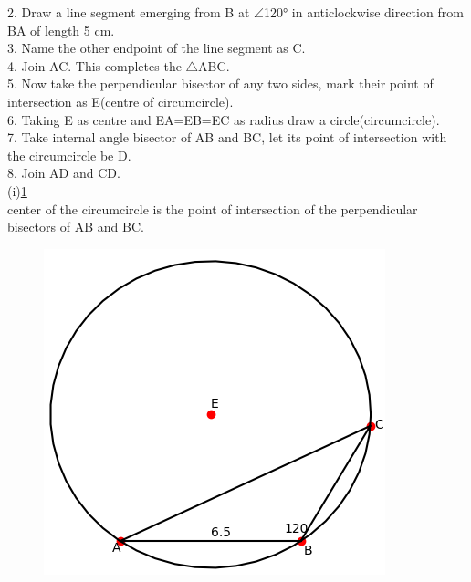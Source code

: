 \documentclass[journal,12pt,twocolumn]{IEEEtran}
\renewcommand\thesection{\arabic{section}}
\begin{document}
\begin{enumerate}[label=\thesection.\arabic*.,ref=\thesection.\theenumi]
2. Draw a line segment emerging from B at $\angle$120° in anticlockwise direction from BA of length 5 cm.\\

3. Name the other endpoint of the line segment as C.\\

4. Join AC. This completes the $\bigtriangleup$ABC.\\

5. Now take the perpendicular bisector of any two sides, mark their point of intersection as E(centre of circumcircle).\\

6. Taking E as centre and EA=EB=EC as radius draw a circle(circumcircle).\\

7. Take internal angle bisector of AB and BC, let its point of intersection with the circumcircle be D.\\

8. Join AD and CD.\\


(i)\ref{fig1} \\
center of the circumcircle is the point of intersection of the perpendicular bisectors of AB and BC.
\begin{figure}[h!]
\centering
\includegraphics[width = \columnwidth]{fig1.png}
\caption{}
\label{fig1}
\end{figure}


\end{enumerate}
\end{document}
